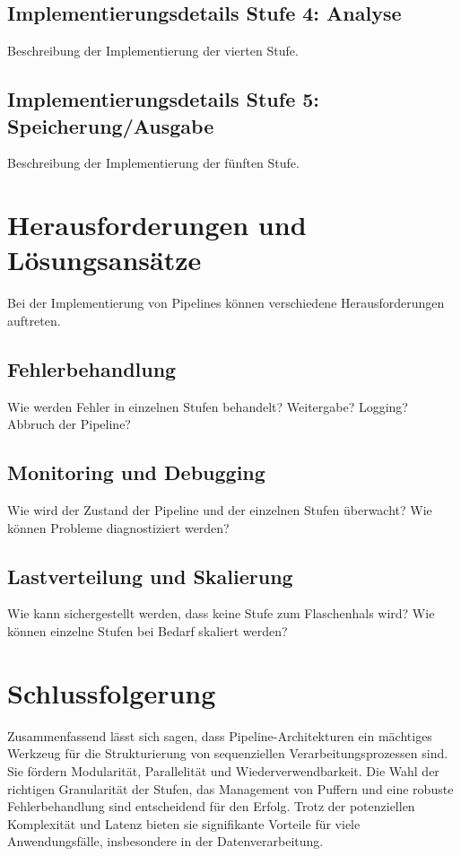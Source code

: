 \documentclass[a4paper]{article} %
\begin{document}
\subsection{Implementierungsdetails Stufe 4: Analyse}
Beschreibung der Implementierung der vierten Stufe.
\blindtext[2]
\lipsum[15-16]

\subsection{Implementierungsdetails Stufe 5: Speicherung/Ausgabe}
Beschreibung der Implementierung der fünften Stufe.
\blindtext[2]
\lipsum[17-18]


\section{Herausforderungen und Lösungsansätze}
Bei der Implementierung von Pipelines können verschiedene Herausforderungen auftreten.
\subsection{Fehlerbehandlung}
Wie werden Fehler in einzelnen Stufen behandelt? Weitergabe? Logging? Abbruch der Pipeline?
\lipsum[19-21]

\subsection{Monitoring und Debugging}
Wie wird der Zustand der Pipeline und der einzelnen Stufen überwacht? Wie können Probleme diagnostiziert werden?
\blindtext[3]
\lipsum[22]

\subsection{Lastverteilung und Skalierung}
Wie kann sichergestellt werden, dass keine Stufe zum Flaschenhals wird? Wie können einzelne Stufen bei Bedarf skaliert werden?
\lipsum[23-25]
\blindtext[2]


\section{Schlussfolgerung}
Zusammenfassend lässt sich sagen, dass Pipeline-Architekturen ein mächtiges Werkzeug für die Strukturierung von sequenziellen Verarbeitungsprozessen sind. Sie fördern Modularität, Parallelität und Wiederverwendbarkeit. Die Wahl der richtigen Granularität der Stufen, das Management von Puffern und eine robuste Fehlerbehandlung sind entscheidend für den Erfolg. Trotz der potenziellen Komplexität und Latenz bieten sie signifikante Vorteile für viele Anwendungsfälle, insbesondere in der Datenverarbeitung.
\lipsum[26-28]
\blindtext
\end{document}
